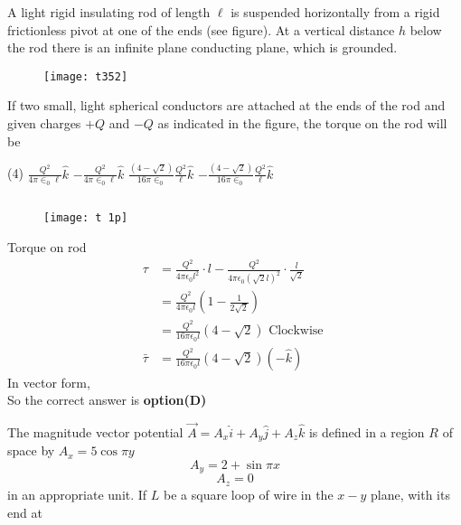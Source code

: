 \begin{questions}
\begin{minipage}{\textwidth}
	\question A light rigid insulating rod of length $\ell$ is suspended horizontally from a rigid frictionless pivot at one of the ends (see figure). At a vertical distance $h$ below the rod there is an infinite plane conducting plane, which is grounded.\\
	\begin{figure}[H]
		\centering
		\texttt{[image: t352]}
	\end{figure}
	If two small, light spherical conductors are attached at the ends of the rod and given charges $+Q$ and $-Q$ as indicated in the figure, the torque on the rod will be
\end{minipage}
\begin{tasks}(4)
	\task[\textbf{A.}] $\frac{Q^{2}}{4 \pi \in_{0} \ell} \hat{k}$
	\task[\textbf{B.}] $-\frac{Q^{2}}{4 \pi \in_{0} \ell} \hat{k}$
	\task[\textbf{C.}] $\frac{(4-\sqrt{2})}{16 \pi \in_{0}} \frac{Q^{2}}{\ell} \hat{k}$
	\task[\textbf{D.}] $-\frac{(4-\sqrt{2})}{16 \pi \in_{0}} \frac{Q^{2}}{\ell} \hat{k}$
\end{tasks}
\begin{answer}$\left. \right. $\\
	\begin{figure}[H]
		\centering
		\texttt{[image: t 1p]}
	\end{figure}
	Torque on rod
	$$
	\begin{aligned}
	\tau &=\frac{Q^{2}}{4 \pi \epsilon_{0} l^{2}} \cdot l-\frac{Q^{2}}{4 \pi \epsilon_{0}(\sqrt{2} l)^{2}} \cdot \frac{l}{\sqrt{2}} \\
	&=\frac{Q^{2}}{4 \pi \epsilon_{0} l}\left(1-\frac{1}{2 \sqrt{2}}\right) \\
	&=\frac{Q^{2}}{16 \pi \epsilon_{0} l}(4-\sqrt{2}) \text { Clockwise } \\
	\bar{\tau} &=\frac{Q^{2}}{16 \pi \epsilon_{0} l}(4-\sqrt{2})(-\hat{k})
	\end{aligned}
	$$
	In vector form,\\
	So the correct answer is \textbf{option(D)}
\end{answer}
\begin{minipage}{\textwidth}
	\question The magnitude vector potential $\vec{A}=A_{x} \hat{i}+A_{y} \hat{j}+A_{z} \hat{k}$ is defined in a region $R$ of space by $A_{x}=5 \cos \pi y$
	$$
	A_{y}=2+\sin \pi x
	$$
	$$
	A_{z}=0
	$$
	in an appropriate unit.
	If $L$ be a square loop of wire in the $x-y$ plane, with its end at

\end{minipage}
\end{questions}
